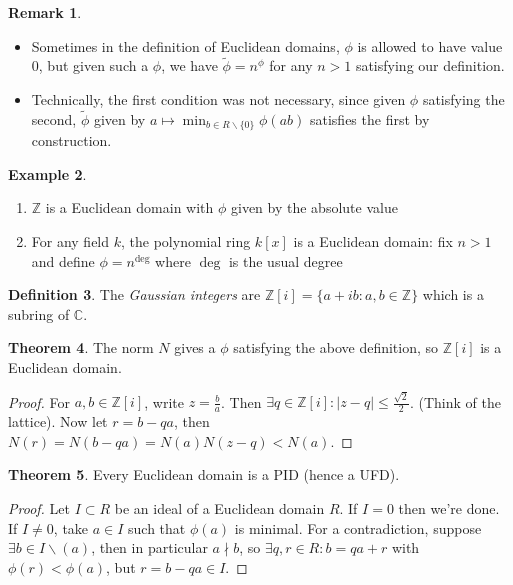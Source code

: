 \documentclass{article}
\newcommand{\Z}{\mathbb{Z}}
\newcommand{\C}{\mathbb{C}}
\theoremstyle{definition}
\newtheorem{defn}{Definition}[subsection]
\newtheorem{thm}[defn]{Theorem}
\newtheorem{example}[defn]{Example}
\newtheorem{remark}[defn]{Remark}
\begin{document}
\begin{remark}
\begin{itemize}
\item Sometimes in the definition of Euclidean domains, $\phi$ is allowed to have value 0, but given such a $\phi$, we have $\widetilde\phi=n^\phi$ for any $n>1$ satisfying our definition.
\item Technically, the first condition was not necessary, since given $\phi$ satisfying the second, $\widetilde\phi$ given by $a\mapsto\min_{b\in R\backslash\{0\}}\phi(ab)$ satisfies the first by construction.
\end{itemize}
\end{remark}

\begin{example}
\begin{enumerate}
\item $\Z$ is a Euclidean domain with $\phi$ given by the absolute value
\item For any field $k$, the polynomial ring $k[x]$ is a Euclidean domain: fix $n>1$ and define $\phi=n^{\deg}$ where $\deg$ is the usual degree
\end{enumerate}
\end{example}

\begin{defn}
The \textit{Gaussian integers} are $\Z[i]=\{a+ib:a,b\in\Z\}$ which is a subring of $\C$.
\end{defn}

\begin{thm}
\label{thm:ZiisED}
The norm $N$ gives a $\phi$ satisfying the above definition, so $\Z[i]$ is a Euclidean domain.
\end{thm}
\begin{proof}
For $a,b\in\Z[i]$, write $z=\frac{b}{a}$. Then $\exists q\in\Z[i]:|z-q|\leq\frac{\sqrt 2}{2}$. (Think of the lattice). Now let $r=b-qa$, then $N(r)=N(b-qa)=N(a)N(z-q)<N(a)$.
\end{proof}

\begin{thm}
Every Euclidean domain is a PID (hence a UFD).
\end{thm}
\begin{proof}
Let $I\subset R$ be an ideal of a Euclidean domain $R$. If $I=0$ then we're done. If $I\neq 0$, take $a\in I$ such that $\phi(a)$ is minimal. For a contradiction, suppose $\exists b\in I\backslash (a)$, then in particular $a\nmid b$, so $\exists q,r\in R:b=qa+r$ with $\phi(r)<\phi(a)$, but $r=b-qa\in I$.
\end{proof}
\end{document}
